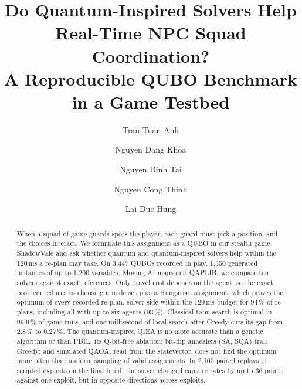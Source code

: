 \documentclass[sigconf]{acmart}
\begin{document}
\setlength{\emergencystretch}{1.5em}

\title{Do Quantum-Inspired Solvers Help Real-Time NPC Squad Coordination?\texorpdfstring{\\}{ }
A Reproducible QUBO Benchmark in a Game Testbed}

\author{Tran Tuan Anh}
\author{Nguyen Dang Khoa}
\author{Nguyen Dinh Tai}
\author{Nguyen Cong Thinh}
\author{Lai Duc Hung}

\renewcommand{\shortauthors}{Tran et al.}

\begin{abstract}
When a squad of game guards spots the player, each guard must pick a position, and the choices
interact. We formulate this assignment as a QUBO in our stealth game ShadowVale and ask whether
quantum and quantum-inspired solvers help within the 120\,ms a re-plan may take. On 3{,}447 QUBOs
recorded in play, 1{,}350 generated instances of up to 1{,}200 variables, Moving AI maps and QAPLIB,
we compare ten solvers against exact references. Only travel cost depends on the agent, so the exact problem reduces to
choosing a node set plus a Hungarian assignment, which proves the optimum of every recorded
re-plan, solver-side within the 120\,ms budget for 94\,\% of re-plans, including all with up to six
agents (93\,\%). Classical tabu search is optimal in 99.9\,\% of game runs, and one millisecond of local
search after Greedy cuts its gap from 2.8\,\% to 0.27\,\%. The quantum-inspired QIEA is no more
accurate than a genetic algorithm or than PBIL, its Q-bit-free ablation; bit-flip annealers (SA,
SQA) trail Greedy; and simulated QAOA, read from the statevector, does not find the optimum more
often than uniform sampling of valid assignments. In 2{,}100 paired replays of scripted exploits on the final build, the solver changed
capture rates by up to 36 points against one exploit, but in opposite directions across exploits.
\end{abstract}



\maketitle
\end{document}
